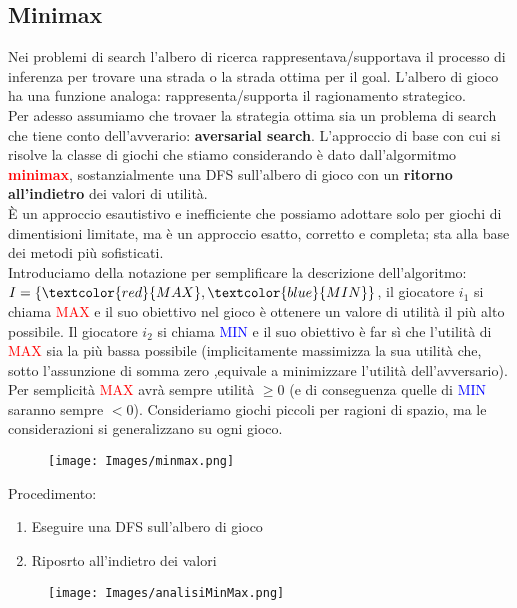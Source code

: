 \documentclass{article}
\begin{document}
\subsection{Minimax}
Nei problemi di search l'albero di ricerca rappresentava/supportava il processo di inferenza per trovare una strada o la strada ottima per il goal. L'albero di gioco ha una funzione analoga: rappresenta/supporta il ragionamento strategico.
\\ Per adesso assumiamo che trovaer la strategia ottima sia un problema di search che tiene conto dell'avverario: \textbf{aversarial search}. L'approccio di base con cui si risolve la classe di giochi che stiamo considerando è dato dall'algormitmo \textbf{\textcolor{red}{minimax}}, sostanzialmente una DFS sull'albero di gioco con un \textbf{ritorno all'indietro} dei valori di utilità.
\\ È un approccio esautistivo e inefficiente che possiamo adottare solo per giochi di dimentisioni limitate, ma è un approccio esatto, corretto e completa; sta alla base dei metodi più sofisticati.
\\Introduciamo della notazione per semplificare la descrizione dell'algoritmo:
\\$I=\{\textcolor{red}{MAX},\textcolor{blue}{MIN}\}$, il giocatore $i_1$ si chiama \textcolor{red}{MAX} e il suo obiettivo nel gioco è ottenere un valore di utilità il più alto possibile. Il giocatore $i_2$ si chiama \textcolor{blue}{MIN} e il suo obiettivo è far sì che l'utilità di \textcolor{red}{MAX} sia la più bassa possibile
(implicitamente massimizza la sua utilità che, sotto l'assunzione di somma zero ,equivale a minimizzare l'utilità dell'avversario).
\\ Per semplicità \textcolor{red}{MAX} avrà sempre utilità $\geq 0$ (e di conseguenza quelle di \textcolor{blue}{MIN} saranno sempre $<0$).
Consideriamo giochi piccoli per ragioni di spazio, ma le considerazioni si generalizzano su ogni gioco.
\begin{figure}[H]
    \centering
    \texttt{[image: Images/minmax.png]}
\end{figure}
Procedimento:
\begin{enumerate}
    \item Eseguire una DFS sull'albero di gioco
    \item Riposrto all'indietro dei valori
\end{enumerate}
\begin{figure}[H]
    \centering
    \texttt{[image: Images/analisiMinMax.png]}
\end{figure}
\end{document}
